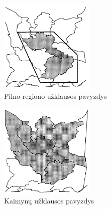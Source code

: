 \label{app:containmentQuery}
\begin{figure}[H]
\begin{center}
\includegraphics[width=0.4\textwidth]{img/ContainmentQuery.png}
\caption{Pilno regiono užklausos pavyzdys}
\end{center}
\end{figure}

\label{app:adjacencyQuery}
\begin{figure}[H]
\begin{center}
\includegraphics[width=0.4\textwidth]{img/AdjacencyQuery.png}
\caption{Kaimynų užklausos pavyzdys}
\end{center}
\end{figure}







